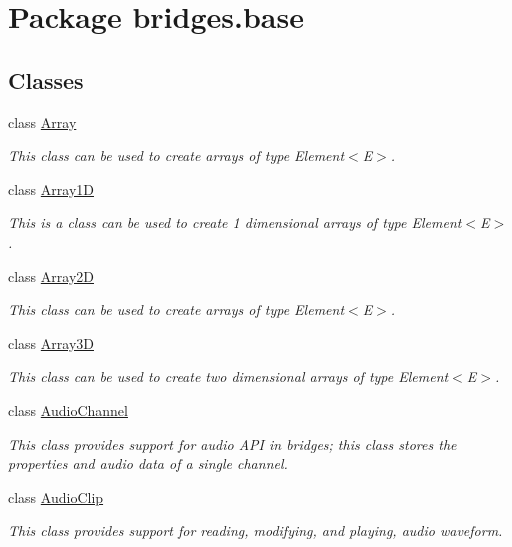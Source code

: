 \hypertarget{namespacebridges_1_1base}{}\section{Package bridges.\+base}
\label{namespacebridges_1_1base}
\subsection*{Classes}
\begin{DoxyCompactItemize}
\item 
class \hyperlink{classbridges_1_1base_1_1_array}{Array}
\begin{DoxyCompactList}\small\item\em This class can be used to create arrays of type Element$<$\+E$>$. \end{DoxyCompactList}\item 
class \hyperlink{classbridges_1_1base_1_1_array1_d}{Array1D}
\begin{DoxyCompactList}\small\item\em This is a class can be used to create 1 dimensional arrays of type Element$<$\+E$>$. \end{DoxyCompactList}\item 
class \hyperlink{classbridges_1_1base_1_1_array2_d}{Array2D}
\begin{DoxyCompactList}\small\item\em This class can be used to create arrays of type Element$<$\+E$>$. \end{DoxyCompactList}\item 
class \hyperlink{classbridges_1_1base_1_1_array3_d}{Array3D}
\begin{DoxyCompactList}\small\item\em This class can be used to create two dimensional arrays of type Element$<$\+E$>$. \end{DoxyCompactList}\item 
class \hyperlink{classbridges_1_1base_1_1_audio_channel}{Audio\+Channel}
\begin{DoxyCompactList}\small\item\em This class provides support for audio A\+PI in bridges; this class stores the properties and audio data of a single channel. \end{DoxyCompactList}\item 
class \hyperlink{classbridges_1_1base_1_1_audio_clip}{Audio\+Clip}
\begin{DoxyCompactList}\small\item\em This class provides support for reading, modifying, and playing, audio waveform. \end{DoxyCompactList}\item 

\end{DoxyCompactItemize}
